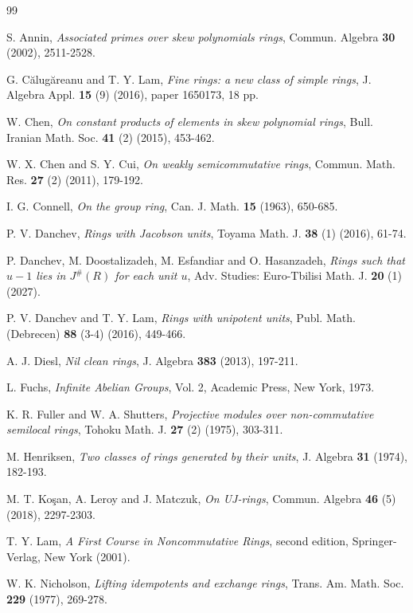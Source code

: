 \documentclass[12pt]{amsart}
\theoremstyle{definition}
\begin{document}
\begin{thebibliography}{99}

S. Annin, {\it Associated primes over skew polynomials rings}, Commun. Algebra \textbf{30} (2002), 2511-2528.

G. C\u{a}lug\u{a}reanu and T. Y. Lam, {\it Fine rings: a new class of simple rings}, J. Algebra Appl. \textbf{15} (9) (2016), paper 1650173, 18 pp.

W. Chen, {\it On constant products of elements in skew polynomial rings}, Bull. Iranian Math. Soc. \textbf{41} (2) (2015), 453-462.

W. X. Chen and S. Y. Cui, {\it On weakly semicommutative rings}, Commun. Math. Res. \textbf{27} (2) (2011), 179-192.

I. G. Connell, {\it On the group ring}, Can. J. Math. \textbf{15} (1963), 650-685.

P. V. Danchev, {\it Rings with Jacobson units}, Toyama Math. J. \textbf{38} (1) (2016), 61-74.

P. Danchev, M. Doostalizadeh, M. Esfandiar and O. Hasanzadeh, {\it Rings such that $u-1$ lies in $J^{\#}(R)$ for each unit $u$}, Adv. Studies: Euro-Tbilisi Math. J. \textbf{20} (1) (2027).

P. V. Danchev and T. Y. Lam, {\it Rings with unipotent units}, Publ. Math. (Debrecen) \textbf{88} (3-4) (2016), 449-466.

A. J. Diesl, {\it Nil clean rings}, J. Algebra {\bf 383} (2013), 197-211.

L. Fuchs, {\it Infinite Abelian Groups}, Vol. 2, Academic Press, New York, 1973.

K. R. Fuller and W. A. Shutters, {\it Projective modules over non-commutative semilocal rings}, Tohoku Math. J. \textbf{27} (2) (1975), 303-311.

M. Henriksen, {\it Two classes of rings generated by their units}, J. Algebra \textbf{31} (1974), 182-193.

M. T. Ko\c{s}an, A. Leroy and J. Matczuk, {\it On UJ-rings}, Commun. Algebra \textbf{46} (5) (2018), 2297-2303.

T. Y. Lam, {\it A First Course in Noncommutative Rings}, second edition, Springer-Verlag, New York (2001).

W. K. Nicholson, {\it Lifting idempotents and exchange rings}, Trans. Am. Math. Soc. \textbf{229} (1977), 269-278.


\end{thebibliography}
\end{document}

